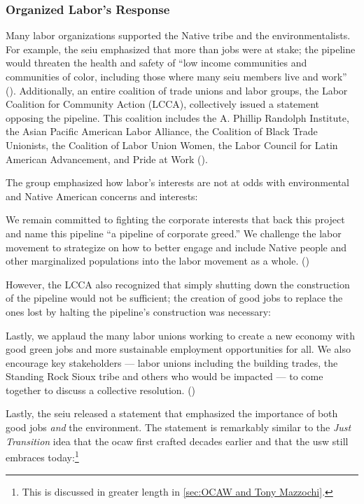 \documentclass[12pt]{article}
\renewenvironment{quote}
  {\list{}{\leftmargin=\parindent\rightmargin=0pt}%
   \item\relax}
  {\endlist}
\begin{document}
\subsubsection{Organized Labor's Response}

Many labor organizations supported the Native tribe and the environmentalists. For example, the \acrfull{seiu} emphasized that more than jobs were at stake; the pipeline would threaten the health and safety of “low income communities and communities of color, including those where many \acrshort{seiu} members live and work” (\cite{nlfUnionsWeighDakota2016}). Additionally, an entire coalition of trade unions and labor groups, the Labor Coalition for Community Action (LCCA), collectively issued a statement opposing the pipeline. This coalition includes the A. Phillip Randolph Institute, the Asian Pacific American Labor Alliance, the Coalition of Black Trade Unionists, the Coalition of Labor Union Women, the Labor Council for Latin American Advancement, and Pride at Work (\cite{apalaAFLCIOConstituencyGroups2016}).

The group emphasized how labor’s interests are not at odds with environmental and Native American concerns and interests:

\begin{quote}
We remain committed to fighting the corporate interests that back this project and name this pipeline “a pipeline of corporate greed.” We challenge the labor movement to strategize on how to better engage and include Native people and other marginalized populations into the labor movement as a whole. (\cite{apalaAFLCIOConstituencyGroups2016})
\end{quote}

\noindent However, the LCCA also recognized that simply shutting down the construction of the pipeline would not be sufficient; the creation of good jobs to replace the ones lost by halting the pipeline’s construction was necessary:

\begin{quote}
Lastly, we applaud the many labor unions working to create a new economy with good green jobs and more sustainable employment opportunities for all. We also encourage key stakeholders — labor unions including the building trades, the Standing Rock Sioux tribe and others who would be impacted — to come together to discuss a collective resolution. (\cite{apalaAFLCIOConstituencyGroups2016})
\end{quote}

\noindent Lastly, the \acrshort{seiu} released a statement that emphasized the importance of both good jobs \emph{and} the environment. The statement is remarkably similar to the \textit{Just Transition} idea that the \acrfull{ocaw} first crafted decades earlier and that the \acrfull{usw} still embraces today:\footnote{This is discussed in greater length in \ref{sec:OCAW and Tony Mazzochi}.}
\end{document}
